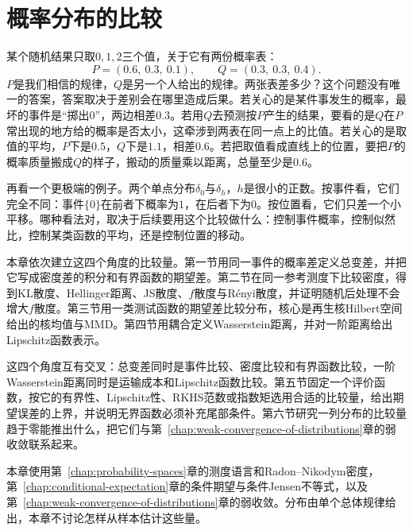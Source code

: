 \chapter{概率分布的比较}
\label{chap:distribution-comparison}

某个随机结果只取$0,1,2$三个值，关于它有两份概率表：
\[
 P=(0.6,\ 0.3,\ 0.1),\qquad Q=(0.3,\ 0.3,\ 0.4) .
\]
$P$是我们相信的规律，$Q$是另一个人给出的规律。两张表差多少？这个问题没有唯一的答案，答案取决于差别会在哪里造成后果。若关心的是某件事发生的概率，最坏的事件是“掷出$0$”，两边相差$0.3$。若用$Q$去预测按$P$产生的结果，要看的是$Q$在$P$常出现的地方给的概率是否太小，这牵涉到两表在同一点上的比值。若关心的是取值的平均，$P$下是$0.5$，$Q$下是$1.1$，相差$0.6$。若把取值看成直线上的位置，要把$P$的概率质量搬成$Q$的样子，搬动的质量乘以距离，总量至少是$0.6$。

再看一个更极端的例子。两个单点分布$\delta_0$与$\delta_h$，$h$是很小的正数。按事件看，它们完全不同：事件$\{0\}$在前者下概率为$1$，在后者下为$0$。按位置看，它们只差一个小平移。哪种看法对，取决于后续要用这个比较做什么：控制事件概率，控制似然比，控制某类函数的平均，还是控制位置的移动。

本章依次建立这四个角度的比较量。第一节用同一事件的概率差定义总变差，并把它写成密度差的积分和有界函数的期望差。第二节在同一参考测度下比较密度，得到KL散度、Hellinger距离、JS散度、$f$散度与Rényi散度，并证明随机后处理不会增大$f$散度。第三节用一类测试函数的期望差比较分布，核心是再生核Hilbert空间给出的核均值与MMD。第四节用耦合定义Wasserstein距离，并对一阶距离给出Lipschitz函数表示。

这四个角度互有交叉：总变差同时是事件比较、密度比较和有界函数比较，一阶Wasserstein距离同时是运输成本和Lipschitz函数比较。第五节固定一个评价函数，按它的有界性、Lipschitz性、RKHS范数或指数矩选用合适的比较量，给出期望误差的上界，并说明无界函数必须补充尾部条件。第六节研究一列分布的比较量趋于零能推出什么，把它们与第~\ref{chap:weak-convergence-of-distributions}章的弱收敛联系起来。

本章使用第~\ref{chap:probability-spaces}章的测度语言和Radon–Nikodym密度，第~\ref{chap:conditional-expectation}章的条件期望与条件Jensen不等式，以及第~\ref{chap:weak-convergence-of-distributions}章的弱收敛。分布由单个总体规律给出，本章不讨论怎样从样本估计这些量。








